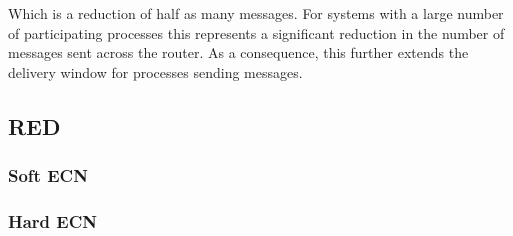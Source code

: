 Which is a reduction of half as many messages.
For systems with a large number of participating processes this represents a significant reduction in the number of messages sent across the router.
As a consequence, this further extends the delivery window for processes sending messages.


\subsection{RED}
\subsubsection{Soft ECN}
\subsubsection{Hard ECN}
